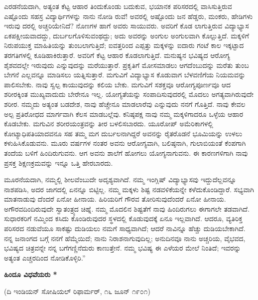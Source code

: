 ಎರಡನೆಯದಾಗಿ, ಅತ್ಯಂತ ಕೆಟ್ಟ ಆಹಾರ ತಿಂದುಕೊಂಡು ಬದುಕುವ, ಭಯಾನಕ ಪರಿಸರದಲ್ಲಿ ವಾಸಿಸುತ್ತಿರುವ ಎಷ್ಟೊಂದು ಸಹಸ್ರ ವಿದ್ಯಾರ್ಥಿಗಳನ್ನು ನಾನು ನೋಡಿ ರುವೆ! ಅವರಲ್ಲಿ ಅಷ್ಟೊಂದು ಜನ ಹೆಡ್ಡರು, ಮಂಕರು, ಹೇಡಿಗಳು ಇರುವು ದರಲ್ಲಿ ಅಚ್ಚರಿಯೇನಿದೆ? ನೊಣಗಳ ಹಾಗೆ ಅವರು ಸಾಯುವರು. ಅವರಿಗೆ ಕೊಡ ಲಾಗುತ್ತಿರುವ ವಿದ್ಯಾಭ್ಯಾಸ ಏಕಪಕ್ಷೀಯವಾದದ್ದು, ದುರ್ಬಲಗೊಳಿಸುವಂಥದ್ದು; ಅದು ಅವರನ್ನು ಅಂಗುಲ ಅಂಗುಲವಾಗಿ ಕೊಲ್ಲುತ್ತಿದೆ. ಮಕ್ಕಳಿಗೆ ನಿರುಪಯುಕ್ತ ಮಾಹಿತಿಯನ್ನು ತುಂಬಲಾಗುತ್ತಿದೆ; ಐವತ್ತರಿಂದ ಎಪ್ಪತ್ತು ಮಕ್ಕಳನ್ನು ಐದಾರು ಗಂಟೆ ಕಾಲ ಇಕ್ಕಟ್ಟಾದ ತರಗತಿಗಳಲ್ಲಿ ಕೂಡಿಹಾಕಿರುತ್ತಾರೆ. ಅವರಿಗೆ ಕೆಟ್ಟ ಆಹಾರ ಕೊಡಲಾಗುತ್ತಿದೆ. ಮನುಷ್ಯನ ಭವಿಷ್ಯದ ಆರೋಗ್ಯ ಶೈಶವದಲ್ಲೇ ಇರುವುದು ಎನ್ನುವುದನ್ನು ಮರೆಯುತ್ತಾರೆ. ಪ್ರಕೃತಿಗೆ ಮೋಸಮಾಡಲು ಆಗದೆಂಬುದನ್ನು ಮರೆತು ತುಂಬ ಬೇಗನೆ ಎಲ್ಲವನ್ನೂ ಮಾಡಿಸಲು ಯತ್ನಿಸುತ್ತಾರೆ. ಮಗುವಿಗೆ ವಿದ್ಯಾಭ್ಯಾಸ ಕೊಡುವಾಗ ಬೆಳವಣಿಗೆಯ ನಿಯಮವನ್ನು ಪಾಲಿಸಬೇಕು. ನಾವು ಸ್ವಲ್ಪ ಕಾಯುವುದನ್ನು ಕಲಿಯ ಬೇಕು. ಮಗುವಿಗೆ ಸಶಕ್ತವೂ ಆರೋಗ್ಯಪೂರ್ಣವೂ ಆದ ಶರೀರಕ್ಕಿಂತ ಮುಖ್ಯವಾದುದು ಬೇರೇನೂ ಇಲ್ಲ. ಯೋಗ್ಯತೆಯನ್ನು ಸಂಪಾದಿಸುವುದರಲ್ಲಿ ಮೊದಲು ಅಗತ್ಯವಾಗಿರುವುದೇ ಶರೀರ. ನಮ್ಮದು ಅತ್ಯಂತ ಬಡದೇಶ, ನಾವು ಹೆಚ್ಚೇನೂ ಮಾಡಲಾರೆವು ಎನ್ನುವುದು ನನಗೆ ಗೊತ್ತಿದೆ. ನಾವು ಕೇವಲ ಅಲ್ಪ ಪ್ರತಿರೋಧದ ಮಾರ್ಗವಾಗಿ ಕೆಲಸ ಮಾಡಬಲ್ಲೆವು. ಕನಿಷ್ಠಪಕ್ಷ ನಾವು ನಮ್ಮ ಮಕ್ಕಳಿಗಾದರೂ ಒಳ್ಳೆಯ ಆಹಾರ ಕೊಡಬೇಕು. ಮಗುವಿನ ಶರೀರಯಂತ್ರವನ್ನು ತೀರ ಬಳಲಿಸಬಾರದು. ಯೂರೋಪ್ ಅಮೆರಿಕಾಗಳಲ್ಲಿ ಕೋಟ್ಯಾಧಿಪತಿಯಾದವನೂ ಸಹ ತಮ್ಮ ಮಗ ದುರ್ಬಲನಾಗಿದ್ದರೆ ಅವನನ್ನು ರೈತರೊಡನೆ ಭೂಮಿಯನ್ನು ಉಳಲು ಕಳುಹಿಸಿಕೊಡುವನು. ಮೂರು ವರ್ಷಗಳ ನಂತರ ಅವನು ಆರೋಗ್ಯವಾಗಿ, ಬಲಿಷ್ಠನಾಗಿ, ಗುಲಾಬಿಯಂತೆ ಕೆಂಪಗಾಗಿ ತಂದೆಯ ಬಳಿಗೆ ಹಿಂದಿರುಗುವನು. ಆಗ ಅವನು ಶಾಲೆಗೆ ಹೋಗಲು ಯೋಗ್ಯನಾಗುವನು. ಈ ಕಾರಣಗಳಿಗಾಗಿ ನಾವು ಪ್ರಸಕ್ತ ಶಿಕ್ಷಣಕ್ರಮವನ್ನು ಇನ್ನೂ ಒತ್ತಿ ಹೇರಬಾರದು.

ಮೂರನೆಯದಾಗಿ, ನಮ್ಮಲ್ಲಿ ಶೀಲವೆಂಬುದೇ ಅದೃಶ್ಯವಾಗಿದೆ. ನಮ್ಮ ಇಂಗ್ಲಿಷ್ ವಿದ್ಯಾಭ್ಯಾಸವು ಇದ್ದುದೆಲ್ಲವನ್ನೂ ನಾಶಪಡಿಸಿ, ಅದರ ಜಾಗದಲ್ಲಿ ಏನನ್ನೂ ಬಿಟ್ಟಿಲ್ಲ. ನಮ್ಮ ಮಕ್ಕಳು ಶಿಷ್ಟ ನಡವಳಿಕೆಯನ್ನೇ ಕಳೆದುಕೊಂಡಿದ್ದಾರೆ. ಸಭ್ಯವಾಗಿ ಮಾತನಾಡುವು ದೆಂದರೆ ಏನೋ ಹೀನಾಯ. ಹಿರಿಯರಿಗೆ ಗೌರವ ತೋರಿಸುವುದೆಂದರೆ ಏನೋ ಹೀನಾಯ. ಅಗೌರವದಿಂದಿರುವುದೇ ಸ್ವಾತಂತ್ರ್ಯದ ಚಿಹ್ನೆ. ನಮ್ಮ ಮೊದಲಿನ ಶಿಷ್ಟತೆಗೆ ನಾವು ಹಿಂದಿರುಗಲು ಈಗಾಗಲೇ ತಡವಾಗಿದೆ. ಸುಧಾರಕರಿಗೆ ನಮ್ಮಿಂದ ಕಸಿದು ಕೊಂಡಿರುವುದರ ಸ್ಥಳದಲ್ಲಿ ಕೊಡುವುದಕ್ಕೆ ಏನೂ ಇಲ್ಲವಾಗಿದೆ. ಆದರೂ, ವ್ಯತಿರಿಕ್ತ ಪರಿಸರದ ನಡುವೆಯೂ ಸಾಕಷ್ಟು ದುಡಿಯಲು ನಮಗೆ ಸಾಧ್ಯವಾಗಿದೆ; ಆದರೆ ನಾವಿನ್ನೂ ಹೆಚ್ಚು ದುಡಿಯಬೇಕಾಗಿದೆ. ನನ್ನ ಜನಾಂಗದ ಬಗ್ಗೆ ನನಗೆ ಹೆಮ್ಮೆಯಿದೆ; ನಾನು ನಿರಾಶನಾಗುವುದಿಲ್ಲ; ಅನುದಿನವೂ ನಾನು ಅಚ್ಚರಿಯ, ವೈಭವದ, ಭವಿಷ್ಯದ ಚಿತ್ರವನ್ನೇ ನನ್ನ ಬಗೆಗಣ್ಣಿನೆದುರು ಕಾಣುತ್ತೇನೆ. ನಮ್ಮ ಭವಿಷ್ಯ ಈ ಎಳೆಯರ ಮೇಲೆ ನಿಂತಿದೆ; ಇವರನ್ನು ಅತ್ಯಂತ ಎಚ್ಚರದಿಂದ ನೋಡಿಕೊಳ್ಳಿರಿ.”

\begin{center}
\textbf{ಹಿಂದೂ ವಿಧವೆಯರು *}
\end{center}

\begin{center}
(ದಿ ಇಂಡಿಯನ್ ಸೋಷಿಯಲ್ ರಿಫಾರ್ಮರ್, ೧೬ ಜೂನ್ ೧೯೦೧)
\end{center}


